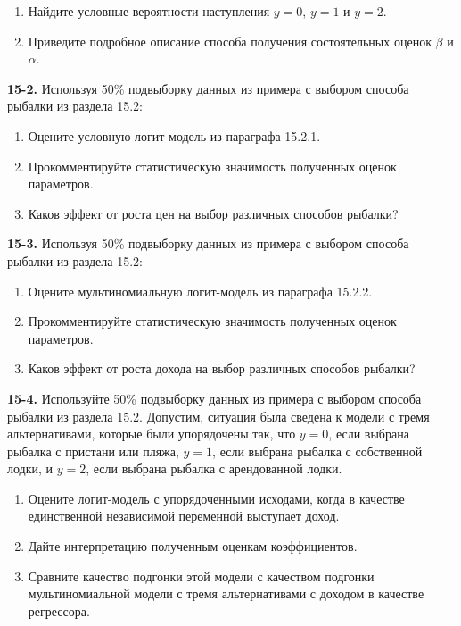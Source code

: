 \begin{enumerate}
\item  Найдите условные вероятности наступления $y=0$, $y=1$ и $y=2$.

\item  Приведите подробное описание способа получения состоятельных оценок $\beta $ и $\alpha $.
\end{enumerate}

\textbf{15-2. } Используя 50\% подвыборку данных из примера с выбором способа рыбалки из раздела 15.2:

\begin{enumerate}
\item  Оцените условную логит-модель из параграфа 15.2.1.

\item  Прокомментируйте статистическую значимость полученных оценок параметров.

\item  Каков эффект от роста цен на выбор различных способов рыбалки?
\end{enumerate}

\textbf{15-3. } Используя 50\% подвыборку данных из примера с выбором способа рыбалки из раздела 15.2:

\begin{enumerate}
\item  Оцените мультиномиальную логит-модель из параграфа 15.2.2.

\item  Прокомментируйте статистическую значимость полученных оценок параметров.

\item  Каков эффект от роста дохода на выбор различных способов рыбалки?
\end{enumerate}

\textbf{15-4. }Используйте 50\% подвыборку данных из примера с выбором способа рыбалки из раздела 15.2. Допустим, ситуация была сведена к модели с тремя альтернативами, которые были упорядочены так, что $y=0$, если выбрана рыбалка с пристани или пляжа, $y=1$, если выбрана рыбалка с собственной лодки, и $y=2$, если выбрана рыбалка с арендованной лодки.

\begin{enumerate}
\item  Оцените логит-модель с упорядоченными исходами, когда в качестве единственной независимой переменной выступает доход.

\item  Дайте интерпретацию полученным оценкам коэффициентов.

\item  Сравните качество подгонки этой модели с качеством подгонки мультиномиальной модели с тремя альтернативами с доходом в качестве регрессора.
\end{enumerate}




